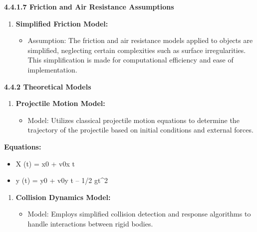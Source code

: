 \documentclass[
]{article}
\begin{document}
\textbf{4.4.1.7 Friction and Air Resistance Assumptions}

\begin{enumerate}
\def\labelenumi{\arabic{enumi}.}
\setcounter{enumi}{6}
\item
  \textbf{Simplified Friction Model:}

  \begin{itemize}
  \item
    Assumption: The friction and air resistance models applied to
    objects are simplified, neglecting certain complexities such as
    surface irregularities. This simplification is made for
    computational efficiency and ease of implementation.
  \end{itemize}
\end{enumerate}

\protect\hypertarget{qrrrrrrrrrrrrrr}{}{}\textbf{4.4.2 Theoretical
Models}

\begin{enumerate}
\def\labelenumi{\arabic{enumi}.}
\item
  \textbf{Projectile Motion Model:}

  \begin{itemize}
  \item
    Model: Utilizes classical projectile motion equations to determine
    the trajectory of the projectile based on initial conditions and
    external forces.
  \end{itemize}
\end{enumerate}

\textbf{Equations:}

\begin{itemize}
\item
  X (t) = x0\hspace{0pt} + v0x \hspace{0pt}t
\item
  y (t) = y0 \hspace{0pt}+ v0y \hspace{0pt} t -- 1/2 gt\^{}2
\end{itemize}

\begin{enumerate}
\def\labelenumi{\arabic{enumi}.}
\setcounter{enumi}{1}
\item
  \textbf{Collision Dynamics Model:}

  \begin{itemize}
  \item
    Model: Employs simplified collision detection and response
    algorithms to handle interactions between rigid bodies.
  \end{itemize}
\end{enumerate}
\end{document}
